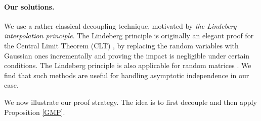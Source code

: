 \documentclass{article}
\newcommand{\1}{^{(1)}}
\newcommand{\2}{^{(2)}}
\newcommand{\zhaoruirevise}[1]{\textcolor{black}{ #1}}
\begin{document}
\paragraph{Our solutions.} We use a rather classical decoupling technique, motivated by {\it the Lindeberg \zhaoruirevise{ interpolation} principle}. The  Lindeberg principle is originally an elegant proof for the Central Limit Theorem (CLT) \citep{Lindeberg1922}, by replacing the random variables with Gaussian ones incrementally and proving the impact is negligible under certain conditions. The Lindeberg principle is also applicable for random matrices \citep{Chatterjee2006,gotze2015asymptotic,pastur2020random}. We find that such methods \zhaoruirevise{are} useful for handling asymptotic independence in our case. 



We now illustrate our proof strategy. The  idea is to first decouple and then apply Proposition \ref{GMP}.
\end{document}
